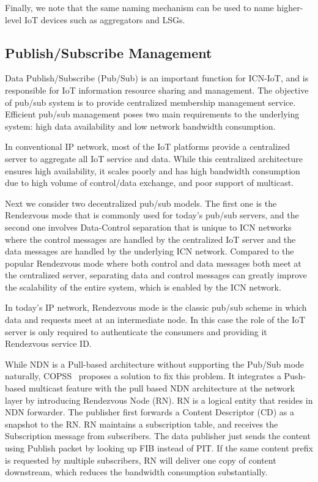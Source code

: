 Finally, we note that the same naming mechanism can be used to name
higher-level IoT devices such as aggregators and LSGs.


\subsection{Publish/Subscribe Management}
Data Publish/Subscribe (Pub/Sub) is an important function for ICN-IoT, and is responsible for IoT information resource sharing and management. The objective of pub/sub system is to provide centralized membership management service. Efficient pub/sub management poses two main requirements to the underlying system: high data availability and low network bandwidth consumption.

In conventional IP network, most of the IoT platforms provide a centralized server to aggregate all IoT service and data. While this centralized architecture ensures high availability, it scales poorly and has high bandwidth consumption due to high volume of control/data exchange, and poor support of multicast.

Next we consider two decentralized pub/sub models.  The first one is the Rendezvous mode that is commonly used for today's pub/sub servers, and the second one involves Data-Control separation that is unique to ICN networks where the control messages are handled by the centralized IoT server and the data messages are handled by the underlying ICN network.  Compared to the popular Rendezvous mode where both control and data messages both meet at the centralized
server, separating data and control messages can greatly improve the scalability of the entire system, which is enabled by the ICN network.

In today's IP network, Rendezvous mode is the classic pub/sub scheme in which data and requests meet at an intermediate node.  In this case the role of the IoT server is only required to authenticate the consumers and providing it Rendezvous service ID.

While NDN is a Pull-based architecture without supporting the Pub/Sub mode naturally,  COPSS~\cite{chen2011copss} proposes a solution to fix this problem. It integrates a Push-based multicast feature with the pull based NDN architecture at the network layer by introducing Rendezvous Node (RN). RN is a logical entity that resides in NDN forwarder. The publisher first forwards a Content Descriptor (CD) as a snapshot to the RN. RN maintains a subscription table, and receives the Subscription message from subscribers. The data publisher just sends the content using Publish packet by looking up FIB instead of PIT. If the same content prefix is requested by multiple subscribers, RN will deliver one copy  of content downstream, which reduces the bandwidth consumption substantially.

